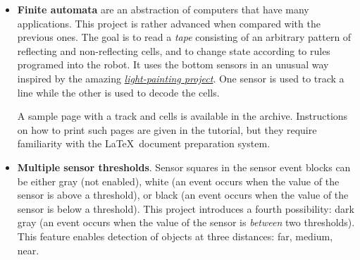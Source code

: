 \documentclass[11pt,a4paper,english]{article}
\begin{document}
\begin{itemize}
\item \textbf{Finite automata} are an abstraction of computers that have
many applications. This project is rather advanced when compared with the
previous ones. The goal is to read a \emph{tape} consisting of an
arbitrary pattern of reflecting and non-reflecting cells, and to change
state according to rules programed into the robot. It uses the bottom
sensors in an unusual way inspired by the amazing
\href{https://www.thymio.org/en:barcodelightpainting}%
{\textit{light-painting project}}. One sensor is used to track a line
while the other is used to decode the cells.

A sample page with a track and cells is available in the archive.
Instructions on how to print such pages are given in the tutorial,
but they require familiarity with the \LaTeX\ document preparation
system.

\item \textbf{Multiple sensor thresholds}. Sensor squares in the sensor
event blocks can be either gray (not enabled), white (an event occurs
when the value of the sensor is above a threshold), or black (an event
occurs when the value of the sensor is below a threshold). This project
introduces a fourth possibility: dark gray (an event occurs when the
value of the sensor is \emph{between} two thresholds). This feature
enables detection of objects at three distances: far, medium, near.

\end{itemize}
\end{document}
